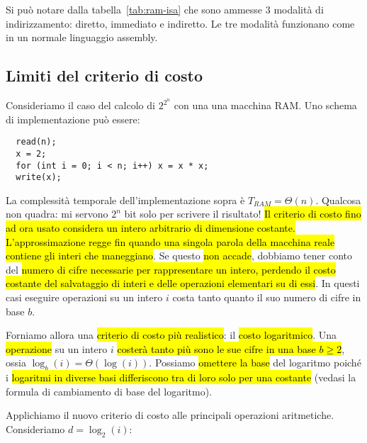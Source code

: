 \documentclass[a4paper,11pt,twoside]{article}
\theoremstyle{plain}
\theoremstyle{definition}
\theoremstyle{remark}
\begin{document}
Si può notare dalla tabella~\ref{tab:ram-isa} che sono ammesse 3 modalità di
indirizzamento: diretto, immediato e indiretto. Le tre modalità funzionano come
in un normale linguaggio assembly.

\subsection{Limiti del criterio di costo}\label{sec:log-costo}

Consideriamo il caso del calcolo di $2^{2^n}$ con una una macchina RAM\@. Uno
schema di implementazione può essere:

\begin{lstlisting}
  read(n);
  x = 2;
  for (int i = 0; i < n; i++) x = x * x;
  write(x);
\end{lstlisting}

La complessità temporale dell'implementazione sopra è $T_{RAM} = \Theta(n)$.
Qualcosa non quadra: mi servono $2^n$ bit solo per scrivere il risultato! \hl{Il
criterio di costo fino ad ora usato considera un intero arbitrario di dimensione
costante. L'approssimazione regge fin quando una singola parola della macchina
reale contiene gli interi che maneggiano}. Se questo \hl{non accade}, dobbiamo
tener conto del \hl{numero di cifre necessarie per rappresentare un intero,
perdendo il costo costante del salvataggio di interi e delle operazioni
elementari su di essi}. In questi casi eseguire operazioni su un intero $i$
costa tanto quanto il suo numero di cifre in base $b$.

Forniamo allora una \hl{criterio di costo più realistico}: il \hl{costo
logaritmico}. Una \hl{operazione} su un intero $i$ \hl{costerà tanto più sono le
sue cifre in una base $b \geq 2$}, ossia $\log_b(i) = \Theta(\log(i))$. Possiamo
\hl{omettere la base} del logaritmo poiché i \hl{logaritmi in diverse basi
differiscono tra di loro solo per una costante} (vedasi la formula di
cambiamento di base del logaritmo).

Applichiamo il nuovo criterio di costo alle principali operazioni aritmetiche.
Consideriamo $d = \log_2(i)$:
\end{document}

